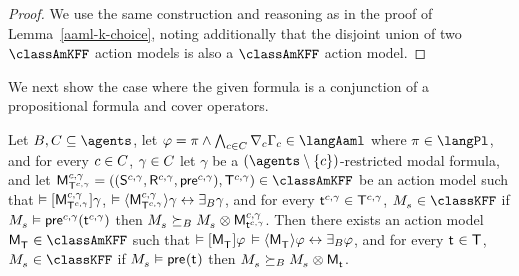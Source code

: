 \begin{proof}[Proof]
We use the same construction and reasoning as in the proof of Lemma~\ref{aaml-k-choice}, noting additionally that the disjoint union of two $\classAmKFF$ action models is also a $\classAmKFF$ action model.
\end{proof}

We next show the case where the given formula is a conjunction of a propositional formula and cover operators.

\begin{lemma}\label{aaml-k45-covers}
Let $\agentsB, \agentsC \subseteq \agents$, 
let $\phi = \pi \land \bigwedge_{\agentC \in \agentsC} \coverC \Gamma_\agentC \in \langAaml$ where $\pi \in \langPl$, and 
for every $\agentC \in \agentsC$, $\gamma \in \agentsC$
let $\gamma$ be a $(\agents \setminus \{\agentC\})$-restricted modal formula, and
let $\aPModelAndTuple[\agentC, \gamma]{\aStatesT[\agentC, \gamma]} \in \classAmKFF$ be an action model such that 
$\entails \actionA{\aPModel[\agentC, \gamma]{\aStatesT[\agentC, \gamma]}} \gamma$,
$\entails \actionE{\aPModel[\agentC, \gamma]{\aStatesT[\agentC, \gamma]}} \gamma \iff \someactsBs \gamma$, and
for every $\aStateT[\agentC, \gamma] \in \aStatesT[\agentC, \gamma]$, $\kPModel{\kStateS} \in \classKFF$ if $\kPModel{\kStateS} \entails \aPrecondition[\agentC, \gamma](\aStateT[\agentC, \gamma])$ then $\kPModel{\kStateS} \simulatesBs \kPModel{\kStateS} \exec \aPModel[\agentC, \gamma]{\aStateT[\agentC, \gamma]}$.
Then there exists an action model $\aPModel{\aStatesT} \in \classAmKFF$ such that 
$\entails \actionA{\aPModel{\aStatesT}} \phi$
$\entails \actionE{\aPModel{\aStatesT}} \phi \iff \someactsBs \phi$, and
for every $\aStateT \in \aStatesT$, $\kPModel{\kStateS} \in \classKFF$ if $\kPModel{\kStateS} \entails \aPrecondition(\aStateT)$ then $\kPModel{\kStateS} \simulatesBs \kPModel{\kStateS} \exec \aPModel{\aStateT}$.
\end{lemma}

